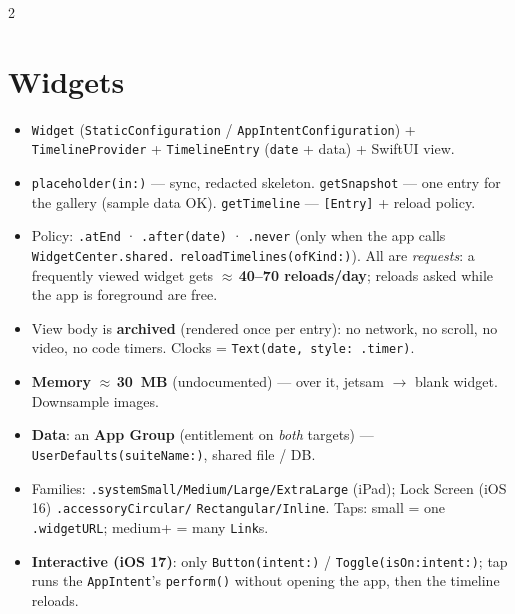\documentclass[8pt]{extarticle}
\begin{document}


\begin{multicols}{2}
\raggedright

\section{Widgets}
\begin{itemize}
  \item \texttt{Widget} (\texttt{StaticConfiguration} /
        \texttt{AppIntentConfiguration}) + \texttt{TimelineProvider}
        + \texttt{TimelineEntry} (\texttt{date} + data) + SwiftUI view.
  \item \texttt{placeholder(in:)} — sync, redacted skeleton.
        \texttt{getSnapshot} — one entry for the gallery (sample data OK).
        \texttt{getTimeline} — \texttt{[Entry]} + reload policy.
  \item Policy: \texttt{.atEnd} · \texttt{.after(date)} · \texttt{.never}
        (only when the app calls \texttt{WidgetCenter.shared.}\allowbreak
        \texttt{reloadTimelines(ofKind:)}). All are \emph{requests}: a
        frequently viewed widget gets $\approx$\,\textbf{40--70 reloads/day};
        reloads asked while the app is foreground are free.
  \item View body is \textbf{archived} (rendered once per entry): no
        network, no scroll, no video, no code timers. Clocks =
        \texttt{Text(date, style: .timer)}.
  \item \textbf{Memory} $\approx$\,\textbf{30~MB} (undocumented)\unverified{} — over it,
        jetsam $\to$ blank widget. Downsample images.
  \item \textbf{Data}: an \textbf{App Group} (entitlement on \emph{both}
        targets) — \texttt{UserDefaults(suiteName:)}, shared file / DB.
  \item Families: \texttt{.systemSmall/Medium/Large/}\allowbreak\texttt{ExtraLarge}
        (iPad); Lock Screen (iOS 16) \texttt{.accessoryCircular/}\allowbreak
        \texttt{Rectangular/Inline}. Taps: small = one \texttt{.widgetURL};
        medium+ = many \texttt{Link}s.
  \item \textbf{Interactive (iOS 17)}: only \texttt{Button(intent:)} /
        \texttt{Toggle(isOn:intent:)}; tap runs the \texttt{AppIntent}'s
        \texttt{perform()} without opening the app, then the timeline reloads.
\end{itemize}


\end{multicols}
\end{document}
